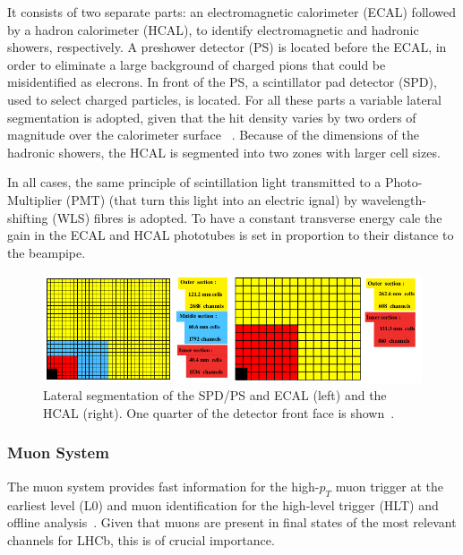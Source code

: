 It consists of two separate parts: an electromagnetic calorimeter (ECAL) followed by a hadron calorimeter (HCAL), to identify electromagnetic and hadronic showers, respectively. A preshower detector (PS) is located before the ECAL, in order to eliminate a large background of charged pions that could be misidentified as elecrons. In front of the PS, a scintillator pad detector (SPD), used to select charged particles, is located. For all these parts a variable lateral segmentation is adopted, given that the hit density varies by two orders of magnitude over the calorimeter surface ~\cite{Alves:2008zz}. Because of the dimensions of the hadronic showers, the HCAL is segmented into two zones with larger cell sizes. 

In all cases, the same principle of scintillation light transmitted to a Photo-Multiplier (PMT) (that turn this light into an electric ignal) by wavelength-shifting (WLS) fibres is adopted. To have a constant transverse energy cale the gain in the ECAL and HCAL phototubes is set in proportion to their distance to the beampipe.  

\begin{figure} [htb!]
\begin{center}
\includegraphics[scale=0.7]{figs/CALO.png}
\caption{Lateral segmentation of the SPD/PS and ECAL (left) and the HCAL (right). One quarter of the detector front face is shown~\cite{Alves:2008zz}.\label{fig:lhcb_calo}}
\end{center}
\end{figure}



\subsubsection{Muon System} 
The muon system provides fast information for the high-$p_T$ muon trigger at the earliest level (L0) and muon identification for the high-level trigger (HLT) and offline analysis~\cite{Alves:2008zz}. Given that muons are present in final states of the most relevant channels for LHCb, this is of crucial importance.

